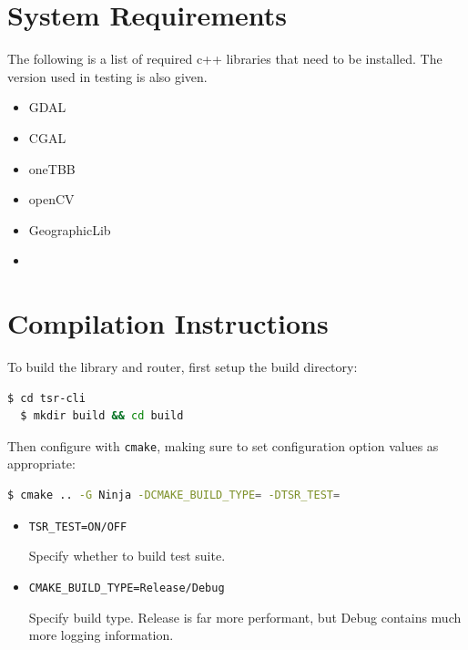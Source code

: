 \documentclass[12pt]{article}
\begin{document}
\pagebreak
\begin{appendices}

  \section{System Requirements}

  The following is a list of required c++ libraries that need to be installed. The version used in testing is also given.

  \begin{itemize}
    \item GDAL
    \item CGAL
    \item oneTBB
    \item openCV
    \item GeographicLib
    \item
  \end{itemize}

  \section{Compilation Instructions}

  To build the library and router, first setup the build directory:

  \begin{lstlisting}[language=bash]
  $ cd tsr-cli
  $ mkdir build && cd build
\end{lstlisting}

  \noindent Then configure with \texttt{cmake}, making sure to set configuration option values as appropriate:

  \begin{lstlisting}[language=bash]
  $ cmake .. -G Ninja -DCMAKE_BUILD_TYPE= -DTSR_TEST=
\end{lstlisting}

  \vspace*{-2em}

  \begin{itemize}
    \item \texttt{TSR\_TEST=ON/OFF}

          Specify whether to build test suite.

    \item \texttt{CMAKE\_BUILD\_TYPE=Release/Debug}

          Specify build type. Release is far more performant, but Debug contains much more logging information.
  \end{itemize}



\end{appendices}
\end{document}
